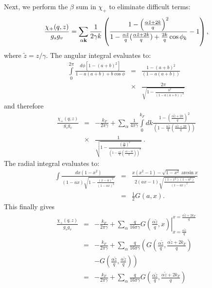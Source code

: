 \documentclass[aps,prb,twocolumn,superscriptaddress]{revtex4-2}
\newcommand{\kf}{k_F}
\newcommand{\bfk}{{\bf k}}
\newcommand{\zt}{\tilde z}
\begin{document}
Next, we perform the $\beta$ sum in $\chi_+$ to eliminate difficult terms:
\begin{equation}
  \frac{\chi_+(q,z)}{g_sg_v}=
  \sum_{\alpha \bfk} \frac{1}{2\gamma k}\left(\frac{ 1 - \left(\frac{\alpha \zt + 2k}{q}\right)^2 }{ 1- \frac{\alpha \zt}{q}(\frac{\alpha \zt+2k}{q}) + \frac{2k}{q}
  \cos \phi_k} - 1\right),
\end{equation}
where $\zt = z/\gamma$.
The angular integral evaluates to:
\begin{eqnarray}
  \int\limits_0^{2\pi} \frac{d\phi[1-(a+b)^2]}{1-a(a+b)+b \cos\phi} &=&
  \frac{1-(a+b)^2}{(1-a(a+b))} \nonumber\\
  &\times&
  \frac{2\pi}{\sqrt{1-\frac{b^2}{(1-a(a+b))^2 } }}
\end{eqnarray}
and therefore
\begin{eqnarray}
  \frac{\chi_+(q,z)}{g_sg_v} &=&  -\frac{\kf}{2\pi\gamma}
  +\sum_{\alpha }\frac{1 }{4\pi\gamma }\int\limits_0^{\kf}  dk \frac{1-\left(\frac{\alpha \zt+2k}{q}\right)^2}{\left(1-\frac{\alpha \zt}{q}\left(\frac{\alpha \zt+2k}{q}\right)\right)} \nonumber\\
  &\times&
  \frac{1}{\sqrt{1-\frac{\left(\frac{2k}{q}\right)^2}{\left(1-\frac{\alpha \zt}{q}\left(\frac{\alpha \zt+2k}{q}\right)\right)^2}}}\:.
\end{eqnarray}
The radial integral evaluates to:
\begin{eqnarray}
  \!\int \! \frac{dx(1-x^2)}{\left(1-a x\right)\! \sqrt{1-\frac{\left(x-a\right)^2}{\left(1-a x\right)^2}}}
    &=& \frac{x(x^2-1)-\sqrt{1-x^2}\arcsin x}{2(ax-1)\sqrt{\frac{(1-x^2)(1-a^2)}{(1-ax)^2}}} \nonumber\\
     &=& \frac{1}{2}G(a,x).
\end{eqnarray}
This finally gives
\begin{eqnarray}
  \frac{\chi_+(q,z)}{g_sg_v}
  &=&
  -\frac{\kf}{2\pi\gamma}+\sum_{\alpha  }\frac{ q }{16\pi\gamma } \left. G\left(\frac{\alpha \zt}{q},x\right) \right|_{x=\frac{\alpha \zt}{q}}^{x=\frac{\alpha \zt +2\kf}{q}}
  \nonumber\\
   &=&
   -\frac{\kf}{2\pi\gamma}+\sum_{\alpha  }\frac{ q }{16\pi\gamma }  \left(G\left(\frac{\alpha \zt}{q},\frac{\alpha \zt +2\kf}{q}\right) \right.\nonumber\\
   && \left. - G\left(\frac{\alpha \zt}{q},\frac{\alpha \zt }{q}\right)\right) \nonumber\\
   &=& -\frac{\kf}{2\pi\gamma}+\sum_{\alpha  }\frac{ q }{16\pi\gamma }  G\left(\frac{\alpha \zt}{q},\frac{\alpha \zt +2\kf}{q}\right) \label{eq:ResponseDoped}
\end{eqnarray}
\end{document}
